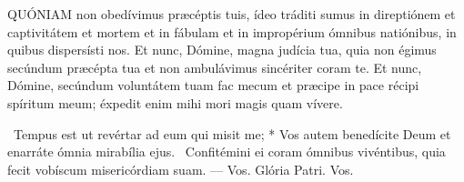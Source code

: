 

\lettrine[lines=2]{Q}{UÓNIAM} non obedívimus præcéptis tuis, ídeo tráditi sumus in direptiónem et captivitátem et mortem et in fábulam et in impropérium ómnibus natiónibus, in quibus dispersísti nos. Et nunc, Dómine, magna judícia tua, quia non égimus secúndum præcépta tua et non ambulávimus sincériter coram te. Et nunc, Dómine, secúndum voluntátem tuam fac mecum et præcipe in pace récipi spíritum meum; éxpedit enim mihi mori magis quam vívere.

\R\ Tempus est ut revértar ad eum qui misit me; * Vos autem benedícite Deum et enarráte ómnia mirabília ejus. \V\ Confitémini ei coram ómnibus vivéntibus, quia fecit vobíscum misericórdiam suam. — Vos. Glória Patri. Vos.






